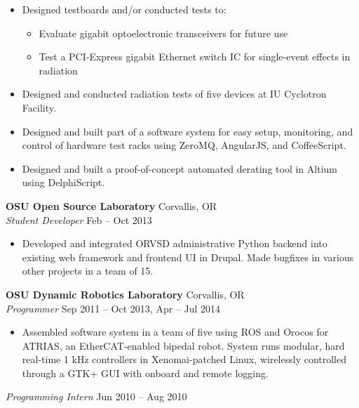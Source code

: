 \documentclass[10pt,letterpaper,margin]{res}
\newcommand{\org}[2]{{\bf #1} \hfill {\color{lightgray} #2} \\}
\newcommand{\pos}[2]{{\it #1} \hfill {\color{lightgray} #2} \vspace{0.0em}}
\begin{document}
\begin{resume}
\begin{itemize}
    \item Designed testboards and/or conducted tests to:
        \begin{itemize}
            \item Evaluate gigabit optoelectronic transceivers for future use
            \item Test a PCI-Express gigabit Ethernet switch IC for
                single-event effects in radiation
        \end{itemize}
    \item Designed and conducted radiation tests of five devices at IU
        Cyclotron Facility.
    \item Designed and built part of a software system for easy setup,
        monitoring, and control of hardware test racks using ZeroMQ, AngularJS,
        and CoffeeScript.
    \item Designed and built a proof-of-concept automated derating tool in
        Altium using DelphiScript.
\end{itemize}


\org {OSU Open Source Laboratory} {Corvallis, OR}
\pos {Student Developer} {Feb -- Oct 2013}

\begin{itemize}
    \item Developed and integrated ORVSD administrative Python backend into
        existing web framework and frontend UI in Drupal. Made bugfixes in
        various other projects in a team of 15.
\end{itemize}


\org {OSU Dynamic Robotics Laboratory} {Corvallis, OR}
\pos {Programmer} {Sep 2011 -- Oct 2013, Apr -- Jul 2014}

\begin{itemize}
    \item Assembled software system in a team of five using ROS and Orocos for
        ATRIAS, an EtherCAT-enabled bipedal robot. System runs modular, hard
        real-time 1 kHz controllers in Xenomai-patched Linux, wirelessly
        controlled through a GTK+ GUI with onboard and remote logging.
\end{itemize}

\pos {Programming Intern} {Jun 2010 -- Aug 2010}


\end{resume}
\end{document}
